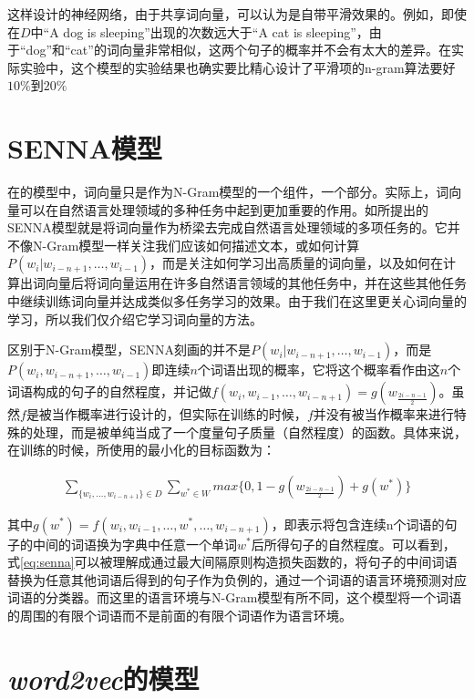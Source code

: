 这样设计的神经网络，由于共享词向量，可以认为是自带平滑效果的。例如，即使在$D$中``A dog is sleeping''出现的次数远大于``A cat is sleeping''，由于``dog''和``cat''的词向量非常相似，这两个句子的概率并不会有太大的差异。在实际实验中，这个模型的实验结果也确实要比精心设计了平滑项的n-gram算法要好$10\%$到$20\%$

\section{SENNA模型}
\label{sec:senna}
在\citep{bengio2006neural}的模型中，词向量只是作为N-Gram模型的一个组件，一个部分。实际上，词向量可以在自然语言处理领域的多种任务中起到更加重要的作用。如\citep{collobert2011natural}所提出的SENNA模型就是将词向量作为桥梁去完成自然语言处理领域的多项任务的。它并不像N-Gram模型一样关注我们应该如何描述文本，或如何计算$P(w_i|w_{i-n+1}, \dots , w_{i-1})$，而是关注如何学习出高质量的词向量，以及如何在计算出词向量后将词向量运用在许多自然语言领域的其他任务中，并在这些其他任务中继续训练词向量并达成类似多任务学习的效果。由于我们在这里更关心词向量的学习，所以我们仅介绍它学习词向量的方法。

区别于N-Gram模型，SENNA刻画的并不是$P(w_i|w_{i-n+1}, \dots , w_{i-1})$，而是$P(w_i, w_{i-n+1}, \dots , w_{i-1})$即连续$n$个词语出现的概率，它将这个概率看作由这$n$个词语构成的句子的自然程度，并记做$f(w_i, w_{i-1}, \dots , w_{i-n+1}) = g(w_{\frac{2i-n-1}{2}})$。虽然$f$是被当作概率进行设计的，但实际在训练的时候，$f$并没有被当作概率来进行特殊的处理，而是被单纯当成了一个度量句子质量（自然程度）的函数。具体来说，在训练的时候，所使用的最小化的目标函数为：

\begin{eqnarray}
\label{eq:senna}
\sum_{\{w_i, \dots, w_{i-n+1}\} \in D} \sum_{w^* \in W} max\{0, 1 - g(w_{\frac{2i-n-1}{2}}) + g(w^*) \}
\end{eqnarray}

其中$g(w^*) = f(w_i, w_{i-1}, \dots , w^*, \dots , w_{i-n+1})$，即表示将包含连续n个词语的句子的中间的词语换为字典中任意一个单词$w^*$后所得句子的自然程度。可以看到，式\ref{eq:senna}可以被理解成通过最大间隔原则构造损失函数的，将句子的中间词语替换为任意其他词语后得到的句子作为负例的，通过一个词语的语言环境预测对应词语的分类器。而这里的语言环境与N-Gram模型有所不同，这个模型将一个词语的周围的有限个词语而不是前面的有限个词语作为语言环境。

\section{\emph{word2vec}的模型}

